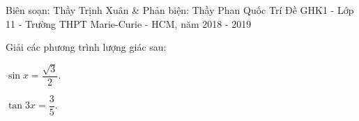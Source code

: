 \begin{name}
	{Biên soạn: Thầy Trịnh Xuân \& Phản biện: Thầy Phan Quốc Trí }
	{Đề GHK1 - Lớp 11 - Trường THPT Marie-Curie - HCM, năm 2018 - 2019}
\end{name}
	\setcounter{ex}{0}\setcounter{bt}{0}

\begin{bt}%
	Giải các phương trình lượng giác sau:
		\begin{listEX}[2]%
		\item $\sin x = \dfrac{\sqrt{3}}{2}$.
		\item $\tan 3x = \dfrac{3}{5}$.
	\end{listEX}
\end{bt}

